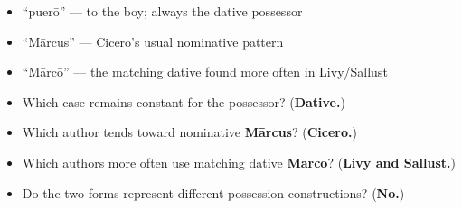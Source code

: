 \begin{itemize}
\raggedright
  \item \textquotedblleft{}puerō\textquotedblright{} — to the boy; always the dative possessor
  \item \textquotedblleft{}Mārcus\textquotedblright{} — Cicero's usual nominative pattern
  \item \textquotedblleft{}Mārcō\textquotedblright{} — the matching dative found more often in Livy/Sallust
\end{itemize}

\begin{tcolorbox}[breakable,colback=teal!4,colframe=teal!35!black,title={Before you move on}]
\begin{itemize}
\raggedright
  \item Which case remains constant for the possessor? (\textbf{Dative.})
  \item Which author tends toward nominative \textbf{Mārcus}? (\textbf{Cicero.})
  \item Which authors more often use matching dative \textbf{Mārcō}? (\textbf{Livy and Sallust.})
  \item Do the two forms represent different possession constructions? (\textbf{No.})
\end{itemize}
\end{tcolorbox}
